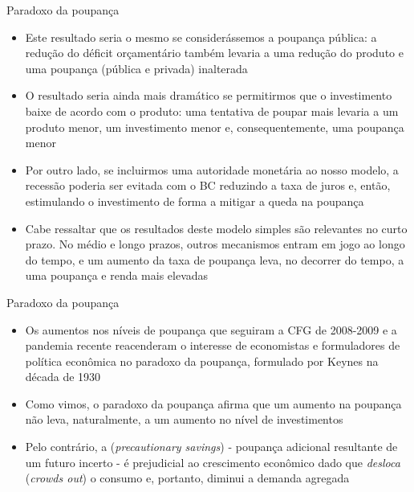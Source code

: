 \documentclass[10pt]{beamer}
\begin{document}
\begin{frame}{Paradoxo da poupança}
    \begin{itemize}
        \item Este resultado seria o mesmo se considerássemos a poupança pública: a redução do déficit orçamentário também levaria a uma redução do produto e uma poupança (pública e privada) inalterada\bigskip

        \item O resultado seria ainda mais dramático se permitirmos que o investimento baixe de acordo com o produto: uma tentativa de poupar mais levaria a um produto menor, um investimento menor e, consequentemente, uma poupança menor\bigskip

        \item Por outro lado, se incluirmos uma autoridade monetária ao nosso modelo, a recessão poderia ser evitada com o BC reduzindo a taxa de juros e, então, estimulando o investimento de forma a mitigar a queda na poupança\bigskip
        \item Cabe ressaltar que os resultados deste modelo simples são relevantes no curto prazo. No médio e longo prazos, outros mecanismos entram em jogo ao longo do tempo, e um aumento da taxa de poupança leva, no decorrer do tempo, a uma poupança e renda mais elevadas
    \end{itemize}
\end{frame}

\begin{frame}{Paradoxo da poupança}
    \begin{itemize}
        \item Os aumentos nos níveis de poupança que seguiram a CFG de 2008-2009 e a pandemia recente reacenderam o interesse de economistas e formuladores de política econômica no paradoxo da poupança, formulado por Keynes na década de 1930\bigskip

        \item Como vimos, o paradoxo da poupança afirma que um aumento na poupança não leva, naturalmente, a um aumento no nível de investimentos\bigskip

        \item Pelo contrário, a  (\emph{precautionary savings}) - poupança adicional resultante de um futuro incerto - é prejudicial ao crescimento econômico dado que \emph{desloca} (\emph{crowds out}) o consumo e, portanto, diminui a demanda agregada
    \end{itemize}
\end{frame}
\end{document}
